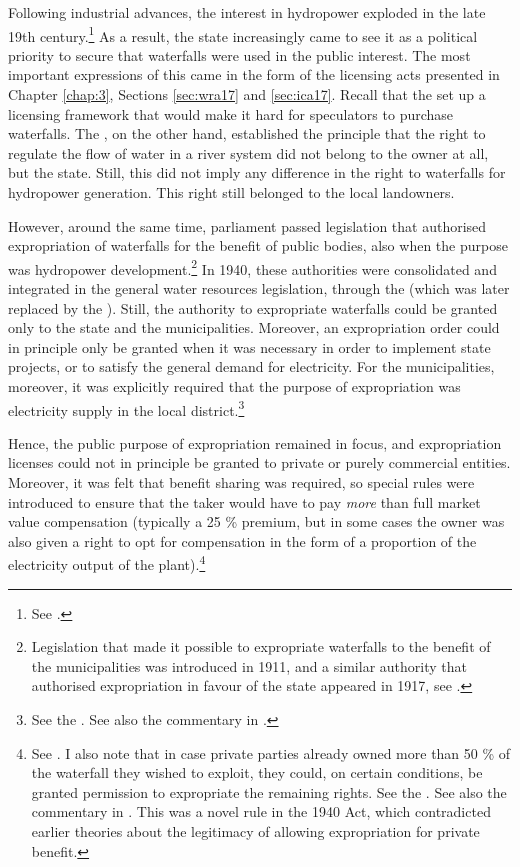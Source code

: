 Following industrial advances, the interest in hydropower exploded in the late 19th century.\footnote{See \cite[58-59]{falkanger87}.} As a result, the state increasingly came to see it as a political priority to secure that waterfalls were used in the public interest. The most important expressions of this came in the form of the licensing acts presented in Chapter \ref{chap:3}, Sections \ref{sec:wra17} and \ref{sec:ica17}. Recall that the \cite{ica17} set up a licensing framework that would make it hard for speculators to purchase waterfalls. The \cite{wra17}, on the other hand, established the principle that the right to regulate the flow of water in a river system did not belong to the owner at all, but the state. Still, this did not imply any difference in the right to waterfalls for hydropower generation. This right still belonged to the local landowners.

However, around the same time, parliament passed legislation that authorised expropriation of waterfalls for the benefit of public bodies, also when the purpose was hydropower development.\footnote{Legislation that made it possible to expropriate waterfalls to the benefit of the municipalities was introduced in 1911, and a similar authority that authorised expropriation in favour of the state appeared in 1917, see \cite[29]{amundsen28}.} In 1940, these authorities were consolidated and integrated in the general water resources legislation, through the \cite{wra40} (which was later replaced by the \cite{wra00}). Still, the authority to expropriate waterfalls could be granted only to the state and the municipalities. Moreover, an expropriation order could in principle only be granted when it was necessary in order to implement state projects, or to satisfy the general demand for electricity. For the municipalities, moreover, it was explicitly required that the purpose of expropriation was electricity supply in the local district.\footnote{See the \cite[148]{wra40}. See also the commentary in \cite[201-210]{sorensen41}.}

Hence, the public purpose of expropriation remained in focus, and expropriation licenses could not in principle be granted to private or purely commercial entities. Moreover, it was felt that benefit sharing was required, so special rules were introduced to ensure that the taker would have to pay {\it more} than full market value compensation (typically a 25 \% premium, but in some cases the owner was also given a right to opt for compensation in the form of a proportion of the electricity output of the plant).\footnote{See \cite[70-91,184,210]{sorensen41}. I also note that in case private parties already owned more than 50 \% of the waterfall they wished to exploit, they could, on certain conditions, be granted permission to expropriate the remaining rights. See the \cite[55]{wra40}. See also the commentary in \cite[70-74]{sorensen41}. This was a novel rule in the 1940 Act, which contradicted earlier theories about the legitimacy of allowing expropriation for private benefit.}

